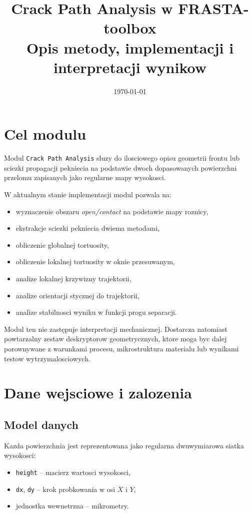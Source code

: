 \documentclass[11pt,a4paper]{article}
\title{Crack Path Analysis w FRASTA-toolbox\\
\large Opis metody, implementacji i interpretacji wynikow}
\author{}
\date{\today}
\begin{document}
\maketitle
\tableofcontents
\newpage

\section{Cel modulu}

Modul \texttt{Crack Path Analysis} sluzy do ilosciowego opisu geometrii
frontu lub sciezki propagacji pekniecia na podstawie dwoch dopasowanych
powierzchni przelomu zapisanych jako regularne mapy wysokosci.

W aktualnym stanie implementacji modul pozwala na:

\begin{itemize}[leftmargin=1.5em]
    \item wyznaczenie obszaru \emph{open/contact} na podstawie mapy roznicy,
    \item ekstrakcje sciezki pekniecia dwiema metodami,
    \item obliczenie globalnej tortuosity,
    \item obliczenie lokalnej tortuosity w oknie przesuwanym,
    \item analize lokalnej krzywizny trajektorii,
    \item analize orientacji stycznej do trajektorii,
    \item analize stabilnosci wyniku w funkcji progu separacji.
\end{itemize}

Modul ten nie zastępuje interpretacji mechanicznej. Dostarcza natomiast
powtarzalny zestaw deskryptorow geometrycznych, ktore moga byc dalej
porownywane z warunkami procesu, mikrostruktura materialu lub wynikami testow
wytrzymalosciowych.

\section{Dane wejsciowe i zalozenia}

\subsection{Model danych}

Kazda powierzchnia jest reprezentowana jako regularna dwuwymiarowa siatka
wysokosci:

\begin{itemize}[leftmargin=1.5em]
    \item \texttt{height} -- macierz wartosci wysokosci,
    \item \texttt{dx}, \texttt{dy} -- krok probkowania w osi \(X\) i \(Y\),
    \item jednostka wewnetrzna -- mikrometry.
\end{itemize}
\end{document}

